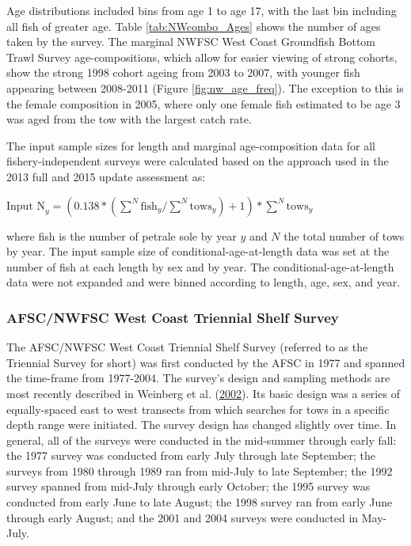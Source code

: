 \documentclass[12pt,]{article}
\begin{document}
Age distributions included bins from age 1 to age 17, with the last bin
including all fish of greater age. Table \ref{tab:NWcombo_Ages} shows
the number of ages taken by the survey. The marginal NWFSC West Coast
Groundfish Bottom Trawl Survey age-compositions, which allow for easier
viewing of strong cohorts, show the strong 1998 cohort ageing from 2003
to 2007, with younger fish appearing between 2008-2011 (Figure
\ref{fig:nw_age_freq}). The exception to this is the female composition
in 2005, where only one female fish estimated to be age 3 was aged from
the tow with the largest catch rate.

The input sample sizes for length and marginal age-composition data for
all fishery-independent surveys were calculated based on the approach
used in the 2013 full and 2015 update assessment as:

\begin{centering}

$\text{Input N}_{y} = (0.138*(\sum_{}^{N} \text{fish}_{y} / \sum_{}^{N} \text{tows}_{y}) + 1)*\sum_{}^{N} \text{tows}_y$ 

\end{centering}

where fish is the number of petrale sole by year \(y\) and \(N\) the
total number of tows by year. The input sample size of
conditional-age-at-length data was set at the number of fish at each
length by sex and by year. The conditional-age-at-length data were not
expanded and were binned according to length, age, sex, and year.

\subsubsection{AFSC/NWFSC West Coast Triennial Shelf
Survey}\label{afscnwfsc-west-coast-triennial-shelf-survey}

The AFSC/NWFSC West Coast Triennial Shelf Survey (referred to as the
Triennial Survey for short) was first conducted by the AFSC in 1977 and
spanned the time-frame from 1977-2004. The survey's design and sampling
methods are most recently described in Weinberg et al.
(\protect\hyperlink{ref-weinberg_2001_2002}{2002}). Its basic design was
a series of equally-spaced east to west transects from which searches
for tows in a specific depth range were initiated. The survey design has
changed slightly over time. In general, all of the surveys were
conducted in the mid-summer through early fall: the 1977 survey was
conducted from early July through late September; the surveys from 1980
through 1989 ran from mid-July to late September; the 1992 survey
spanned from mid-July through early October; the 1995 survey was
conducted from early June to late August; the 1998 survey ran from early
June through early August; and the 2001 and 2004 surveys were conducted
in May-July.
\end{document}
